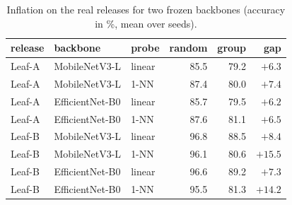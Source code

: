 \begin{table}[h]
\centering\footnotesize
\setlength{\tabcolsep}{4pt}
\caption{Inflation on the real releases for two frozen backbones (accuracy in \%, mean over seeds).}
\label{tab:backbones}
\begin{tabular}{@{}lllrrr@{}}
\toprule
release & backbone & probe & random & group & gap \\
\midrule
Leaf-A & MobileNetV3-L & linear & 85.5 & 79.2 & $+6.3$ \\
Leaf-A & MobileNetV3-L & 1-NN & 87.4 & 80.0 & $+7.4$ \\
Leaf-A & EfficientNet-B0 & linear & 85.7 & 79.5 & $+6.2$ \\
Leaf-A & EfficientNet-B0 & 1-NN & 87.6 & 81.1 & $+6.5$ \\
Leaf-B & MobileNetV3-L & linear & 96.8 & 88.5 & $+8.4$ \\
Leaf-B & MobileNetV3-L & 1-NN & 96.1 & 80.6 & $+15.5$ \\
Leaf-B & EfficientNet-B0 & linear & 96.6 & 89.2 & $+7.3$ \\
Leaf-B & EfficientNet-B0 & 1-NN & 95.5 & 81.3 & $+14.2$ \\
\bottomrule
\end{tabular}
\end{table}

